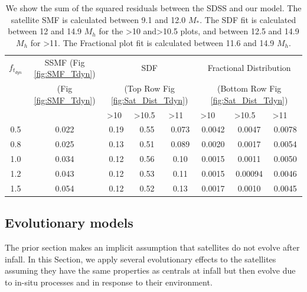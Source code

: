 \begin{table}
\centering
\caption{We show the sum of the squared residuals between the SDSS and our model. The satellite SMF is calculated between 9.1 and 12.0 $M_{*}$. The SDF fit is calculated between 12 and 14.9 $M_h$ for the \textgreater10 and\textgreater10.5 plots, and between 12.5 and 14.9 $M_h$ for \textgreater11. The Fractional plot fit is calculated between 11.6 and 14.9 $M_h$.}
\label{tab:bestfit}
\begin{tabular}{c|c|ccc|ccc}
$f_{t_{dyn}}$   & SSMF   (Fig \ref{fig:SMF_Tdyn})               & \multicolumn{3}{c}{SDF  } \vline & \multicolumn{3}{c}{Fractional Distribution } \\
   &   (Fig \ref{fig:SMF_Tdyn})               & \multicolumn{3}{c}{ (Top Row Fig \ref{fig:Sat_Dist_Tdyn}) } \vline & \multicolumn{3}{c}{ (Bottom Row Fig \ref{fig:Sat_Dist_Tdyn})} \\ \hline
            \multicolumn{1}{l}{} \vline & \multicolumn{1}{l}{} \vline & \multicolumn{1}{l}{\textgreater{}10} & \multicolumn{1}{l}{\textgreater{}10.5} & \multicolumn{1}{l}{\textgreater{}11} \vline & \multicolumn{1}{l}{\textgreater{}10} & \multicolumn{1}{l}{\textgreater{}10.5} & \multicolumn{1}{l}{\textgreater{}11} \\ \hline
0.5    & 0.022   & 0.19  & 0.55    & 0.073    & 0.0042 & 0.0047 & 0.0078  \\
0.8    & 0.025   & 0.13  & 0.51    & 0.089    & 0.0020 & 0.0017 & 0.0054  \\
1.0    & 0.034   & 0.12  & 0.56    & 0.10     & 0.0015 & 0.0011 & 0.0050  \\
1.2    & 0.043   & 0.12  & 0.53    & 0.11     & 0.0015 & 0.00094& 0.0046  \\
1.5    & 0.054   & 0.12  & 0.52    & 0.13     & 0.0017 & 0.0010 & 0.0045                              
\end{tabular}
\end{table}

\subsection{Evolutionary models}

The prior section makes an implicit assumption that satellites do not evolve after infall. In this Section, we apply several evolutionary effects to the satellites assuming they have the same properties as centrals at infall but then evolve due to in-situ processes and in response to their environment.

